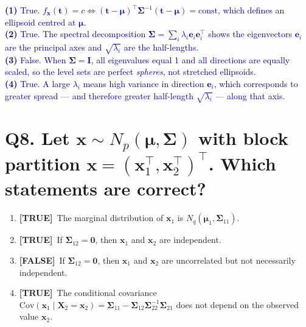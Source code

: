 \documentclass[12pt, a4paper]{article}
\newcommand{\T}{\textcolor{truegreen}{\textbf{[TRUE]}}}
\newcommand{\F}{\textcolor{falsered}{\textbf{[FALSE]}}}
\newcommand{\expl}[1]{\textcolor{darkblue}{\small #1}}
\begin{document}
\expl{
\textbf{(1)} True. $f_{\mathbf{x}}(\mathbf{t}) = c \Leftrightarrow (\mathbf{t} - \boldsymbol{\mu})^\top \boldsymbol{\Sigma}^{-1}(\mathbf{t} - \boldsymbol{\mu}) = \text{const}$, which defines an ellipsoid centred at $\boldsymbol{\mu}$.\\
\textbf{(2)} True. The spectral decomposition $\boldsymbol{\Sigma} = \sum_i \lambda_i \mathbf{e}_i \mathbf{e}_i^\top$ shows the eigenvectors $\mathbf{e}_i$ are the principal axes and $\sqrt{\lambda_i}$ are the half-lengths.\\
\textbf{(3)} False. When $\boldsymbol{\Sigma} = \mathbf{I}$, all eigenvalues equal 1 and all directions are equally scaled, so the level sets are perfect \textit{spheres}, not stretched ellipsoids.\\
\textbf{(4)} True. A large $\lambda_i$ means high variance in direction $\mathbf{e}_i$, which corresponds to greater spread — and therefore greater half-length $\sqrt{\lambda_i}$ — along that axis.
}

\vspace{1.5em}

\section*{Q8. Let $\mathbf{x} \sim N_p(\boldsymbol{\mu}, \boldsymbol{\Sigma})$ with block partition $\mathbf{x} = (\mathbf{x}_1^\top, \mathbf{x}_2^\top)^\top$. Which statements are correct?}

\begin{enumerate}[label=(\arabic*)]
  \item \T\ The marginal distribution of $\mathbf{x}_1$ is $N_q(\boldsymbol{\mu}_1, \boldsymbol{\Sigma}_{11})$.
  \item \T\ If $\boldsymbol{\Sigma}_{12} = \mathbf{0}$, then $\mathbf{x}_1$ and $\mathbf{x}_2$ are independent.
  \item \F\ If $\boldsymbol{\Sigma}_{12} = \mathbf{0}$, then $\mathbf{x}_1$ and $\mathbf{x}_2$ are uncorrelated but not necessarily independent.
  \item \T\ The conditional covariance $\mathrm{Cov}(\mathbf{x}_1 \mid \mathbf{X}_2 = \mathbf{x}_2) = \boldsymbol{\Sigma}_{11} - \boldsymbol{\Sigma}_{12}\boldsymbol{\Sigma}_{22}^{-1}\boldsymbol{\Sigma}_{21}$ does not depend on the observed value $\mathbf{x}_2$.
\end{enumerate}
\end{document}
